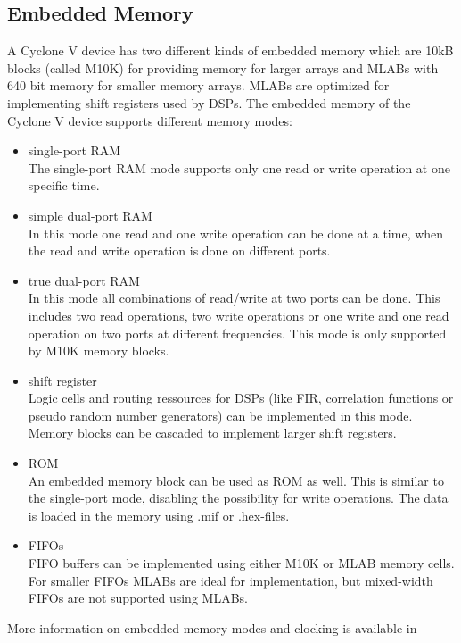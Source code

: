 \subsection{Embedded Memory}
\label{chap:embmem}
A Cyclone V device has two different kinds of embedded memory which are 10kB blocks (called M10K) for providing memory for larger arrays and MLABs with 640 bit memory for smaller memory arrays. MLABs are optimized for implementing shift registers used by DSPs. The embedded memory of the Cyclone V device supports different memory modes:
\begin{itemize}
\item single-port RAM\\
The single-port RAM mode supports only one read or write operation at one specific time.
\item simple dual-port RAM\\
In this mode one read and one write operation can be done at a time, when the read and write operation is done on different ports.
\item true dual-port RAM\\
In this mode all combinations of read/write at two ports can be done. This includes two read operations, two write operations or one write and one read operation on two ports at different frequencies. This mode is only supported by M10K memory blocks.
\item shift register\\
Logic cells and routing ressources for DSPs (like FIR, correlation functions or pseudo random number generators) can be implemented in this mode. Memory blocks can be cascaded to implement larger shift registers.
\item ROM\\
An embedded memory block can be used as ROM as well. This is similar to the single-port mode, disabling the possibility for write operations. The data is loaded in the memory using .mif or .hex-files.
\item FIFOs\\
FIFO buffers can be implemented using either M10K or MLAB memory cells. For smaller FIFOs MLABs are ideal for implementation, but mixed-width FIFOs are not supported using MLABs.
\end{itemize}
More information on embedded memory modes and clocking is available in \cite[chapter 2]{AlteraFPGA15}
